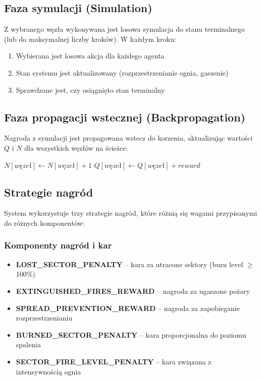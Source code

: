 \documentclass[11pt,a4paper]{article}
\begin{document}
\subsection{Faza symulacji (Simulation)}

Z wybranego węzła wykonywana jest losowa symulacja do stanu terminalnego (lub do maksymalnej liczby kroków). W każdym kroku:
\begin{enumerate}
    \item Wybierana jest losowa akcja dla każdego agenta
    \item Stan systemu jest aktualizowany (rozprzestrzenianie ognia, gaszenie)
    \item Sprawdzane jest, czy osiągnięto stan terminalny
\end{enumerate}

\subsection{Faza propagacji wstecznej (Backpropagation)}

Nagroda z symulacji jest propagowana wstecz do korzenia, aktualizując wartości $Q$ i $N$ dla wszystkich węzłów na ścieżce:

\begin{algorithmic}
    \State $N[węzeł] \gets N[węzeł] + 1$
    \State $Q[węzeł] \gets Q[węzeł] + reward$
\EndFor
\end{algorithmic}

\subsection{Strategie nagród}

System wykorzystuje trzy strategie nagród, które różnią się wagami przypisanymi do różnych komponentów:

\subsubsection{Komponenty nagród i kar}

\begin{itemize}
    \item \textbf{LOST\_SECTOR\_PENALTY} -- kara za utracone sektory (burn level $\geq$ 100\%)
    \item \textbf{EXTINGUISHED\_FIRES\_REWARD} -- nagroda za ugaszone pożary
    \item \textbf{SPREAD\_PREVENTION\_REWARD} -- nagroda za zapobieganie rozprzestrzenianiu
    \item \textbf{BURNED\_SECTOR\_PENALTY} -- kara proporcjonalna do poziomu spalenia
    \item \textbf{SECTOR\_FIRE\_LEVEL\_PENALTY} -- kara związana z intensywnością ognia
\end{itemize}
\end{document}
